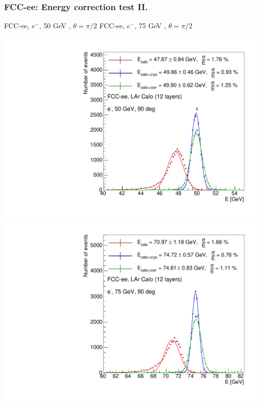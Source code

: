 \documentclass[aspectratio=169]{beamer}
\newcommand{\redtext}[1]{%
  \textcolor{myRed}{#1}
}
\begin{document}
\begin{frame}
  \frametitle{FCC-ee: Energy correction test II.}

  \centering
  FCC-ee, $e^{-}$, \redtext{50 GeV}, $\theta = \pi/2$ \hspace{8mm}
  FCC-ee, $e^{-}$, \redtext{75 GeV}, $\theta = \pi/2$ \\[1.5ex]
  \begin{adjustwidth}{-9mm}{-9mm}
    \includegraphics[width=0.49\linewidth]{figures/12layers/hist_energy_corr_validation_90deg_50GeV.pdf}
    \includegraphics[width=0.49\linewidth]{figures/12layers/hist_energy_corr_validation_90deg_75GeV.pdf}
  \end{adjustwidth}
\end{frame}
\end{document}
